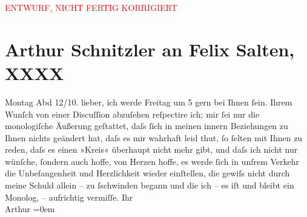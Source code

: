 
\begin{center}
            \textcolor{red}{ENTWURF, NICHT FERTIG KORRIGIERT}
                      \end{center}
            
         
         \renewcommand{\erwaehntePersonen}{Personen: Felix Salten}
         \renewcommand{\erwaehnteOrte}{Orte: Wien}
         \renewcommand{\erwaehnteWerke}{}
               \section[Arthur Schnitzler an Felix Salten, XXXX]{ Arthur Schnitzler an Felix Salten, XXXX}\nopagebreak{}\rehead{ }\begin{ledgroupsized}[t]{13cm}\normalsize\beginnumbering \toendnotes[C]{\smallbreak\pagebreak[2]} 
\pstart
           \raggedleft{}{\pb}Montag Abd 12/10.
               \pend
           \pstart
           lieber, ich werde Freitag um 5 gern bei Ihnen ſein.
               Ihrem Wunſch von einer Discuſſion abzuſehen reſpectire ich; mir ſei nur die
               monologiſche Äußerung geſtattet, daſs ſich in meinen innern Beziehungen zu Ihnen
               nichts geändert hat, daſs es mir wahrhaft leid thut, ſo ſelten mit Ihnen zu reden,
               daſs es {\pb}einen »Kreis« überhaupt
               nicht mehr gibt, und daſs ich nicht nur wünſche, ſondern auch hoffe,  von Herzen hoffe, es werde ſich in unſrem Verkehr
               die Unbefangenheit und Herzlichkeit wieder einſtellen, die gewiſs nicht durch meine
               Schuld allein – zu ſschwinden begann und die ich – es iſt {\pb}und bleibt ein Monolog, –
               aufrichtig vermiſſe. \pend
           \pstart
           Ihr {\\[\baselineskip]}\spacefill\mbox{Arthur}\pend
           \leftskip=0em{}
         
         \endnumbering{}\end{ledgroupsized}\begin{anhang}\end{anhang}\newcommand{\dateiname}{L02984}\newcommand{\titel}{Arthur Schnitzler an Felix Salten, XXXX}\newcommand{\editorInnen}{Martin Anton Müller und Laura Untner}
      